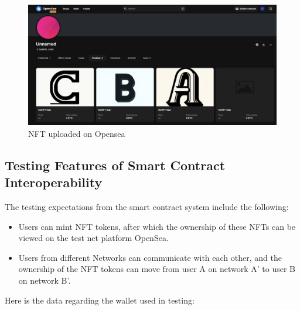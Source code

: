 \begin{figure} [H] \centering
  \includegraphics[scale=0.15]{gambar/opensea.jpeg}
  \caption{NFT uploaded on Opensea}
  \label{fig:opensea}
\end{figure}

\subsection{Testing Features of Smart Contract Interoperability}
The testing expectations from the smart contract system include the following:
\begin{itemize}
    \item Users can mint NFT tokens, after which the ownership of these NFTs can be viewed on the test net platform OpenSea.

    \item Users from different Networks can communicate with each other, and the ownership of the NFT tokens can move from user A on network A' to user B on network B'.
\end{itemize}

Here is the data regarding the wallet used in testing:

\begin{table}[htbp]
  \centering
  \caption{Volume EDV dan ESV antara ground truth dan prediksi}
  \label{tab:volume}
\end{table}

